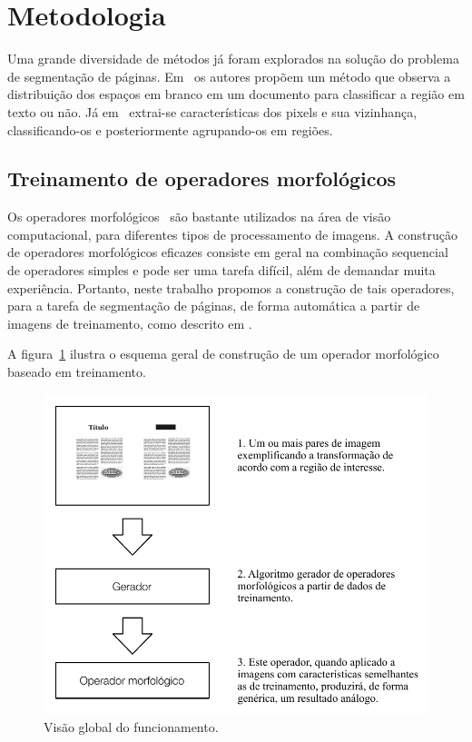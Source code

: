 \documentclass[10pt,a4paper,conference]{IEEEtran}
\begin{document}
\section{Metodologia}

Uma grande diversidade de métodos já foram explorados na solução do
problema de segmentação de
páginas. Em~\cite{Antonacopoulos95representationand} os autores
propõem um método
que observa a distribuição dos espaços em branco em um documento para
classificar a região em texto ou não. Já
em~\cite{Moll07documentcontent} extrai-se características dos pixels e
sua vizinhança, classificando-os e posteriormente agrupando-os em regiões.


\subsection{Treinamento de operadores morfológicos}

Os operadores morfológicos~\cite{Serra:1983:IAM:1098652} são bastante
utilizados na área de visão computacional, para diferentes tipos de
processamento de imagens. A construção de operadores morfológicos
eficazes consiste em geral na combinação sequencial de operadores
simples e pode ser uma tarefa difícil, além de demandar muita
experiência. Portanto, neste trabalho propomos a construção de tais
operadores, para a tarefa de segmentação de páginas, de forma
automática a partir de imagens de treinamento, como descrito em
\cite{Tomita:1996:PrAuMa}.

A figura~\ref{fig:schema_overview} ilustra o esquema geral de
construção de um operador morfológico baseado em treinamento.
\begin{figure}[htb!]
\begin{center}
\includegraphics[scale=0.9]{assets/methodology.pdf}
\end{center}
\caption{Visão global do funcionamento.}
\label{fig:schema_overview}
\end{figure}
\end{document}
